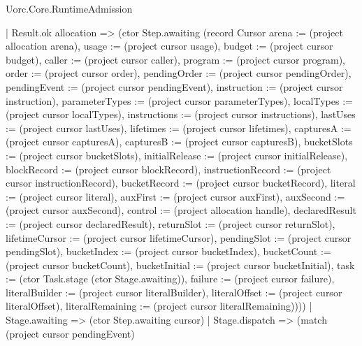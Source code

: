 \begin{lexlean}{Uorc.Core.RuntimeAdmission}
\begin{semanticmodule}
{        | Result.ok allocation => (ctor Step.awaiting (record Cursor {arena := (project allocation arena), usage := (project cursor usage), budget := (project cursor budget), caller := (project cursor caller), program := (project cursor program), order := (project cursor order), pendingOrder := (project cursor pendingOrder), pendingEvent := (project cursor pendingEvent), instruction := (project cursor instruction), parameterTypes := (project cursor parameterTypes), localTypes := (project cursor localTypes), instructions := (project cursor instructions), lastUses := (project cursor lastUses), lifetimes := (project cursor lifetimes), capturesA := (project cursor capturesA), capturesB := (project cursor capturesB), bucketSlots := (project cursor bucketSlots), initialRelease := (project cursor initialRelease), blockRecord := (project cursor blockRecord), instructionRecord := (project cursor instructionRecord), bucketRecord := (project cursor bucketRecord), literal := (project cursor literal), auxFirst := (project cursor auxFirst), auxSecond := (project cursor auxSecond), control := (project allocation handle), declaredResult := (project cursor declaredResult), returnSlot := (project cursor returnSlot), lifetimeCursor := (project cursor lifetimeCursor), pendingSlot := (project cursor pendingSlot), bucketIndex := (project cursor bucketIndex), bucketCount := (project cursor bucketCount), bucketInitial := (project cursor bucketInitial), task := (ctor Task.stage (ctor Stage.awaiting)), failure := (project cursor failure), literalBuilder := (project cursor literalBuilder), literalOffset := (project cursor literalOffset), literalRemaining := (project cursor literalRemaining)})))
      | Stage.awaiting => (ctor Step.awaiting cursor)
      | Stage.dispatch => (match (project cursor pendingEvent)
}
\end{semanticmodule}
\end{lexlean}
